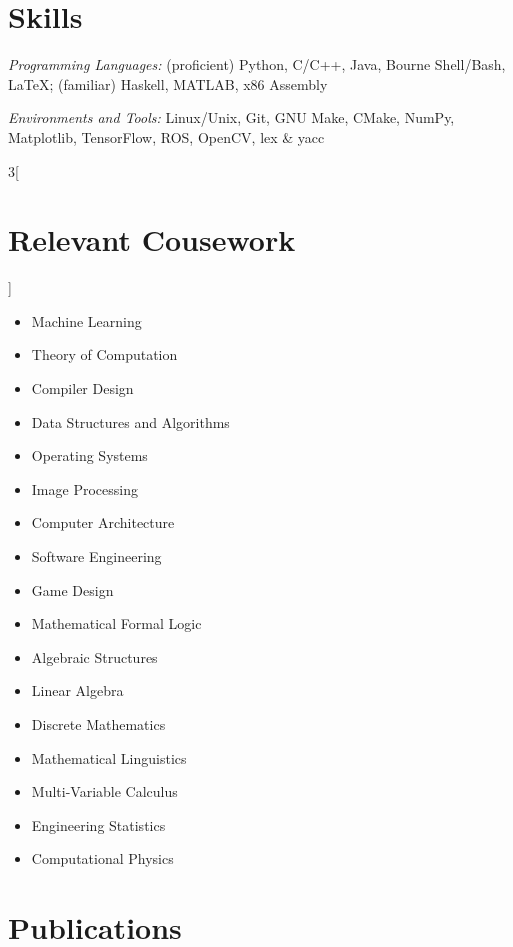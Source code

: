 \documentclass[\ifdefined\cv11pt\else10pt\fi,letterpaper,roman]{moderncv}
\newcommand{\cvonly}[1]{\ifdefined\cv#1\fi}
\let\oldsection\section
\renewcommand{\section}[1]{\vspace*{-1.1ex}\oldsection{#1}}
\begin{document}
\setlength{\premulticols}{0pt}
\section{Skills}
\textit{Programming Languages:} (proficient) Python, C/C++, Java, Bourne Shell/Bash, \LaTeX; (familiar) Haskell, MATLAB\cvonly{, x86 Assembly} \par %
\textit{Environments and Tools:} Linux/Unix, Git, GNU Make, CMake, NumPy, Matplotlib, TensorFlow, ROS, OpenCV, lex \& yacc \par %
\begin{multicols}{3}[\section{Relevant Cousework}\vspace*{-1.2\topsep}]
\begin{itemize}
	\item Machine Learning
	\item Theory of Computation
	\item Compiler Design
	\item Data Structures and Algorithms
	\item Operating Systems
	\item Image Processing
	\item Computer Architecture
	\item Software Engineering
	\cvonly{\item Game Design}
	\item Mathematical Formal Logic
	\item Algebraic Structures
	\item Linear Algebra
	\item Discrete Mathematics
	\cvonly{
		\item Mathematical Linguistics
		\item Multi-Variable Calculus
		\item Engineering Statistics
		\item Computational Physics
	}
\end{itemize}
\end{multicols}
\vspace{-2ex}

\section{Publications}
	\nocite{*}
	\printbibliography[heading=none]{}
\end{document}
